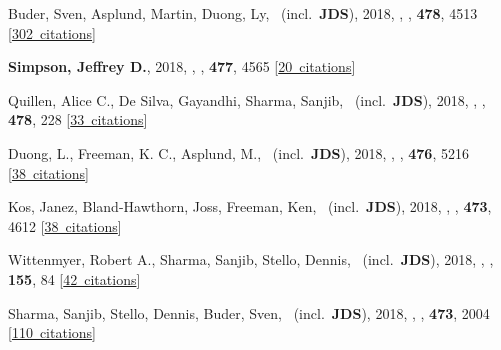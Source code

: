 \item[{\color{numcolor}\scriptsize19}] Buder, Sven, Asplund, Martin, Duong, Ly, \etal\ (incl.\ \textbf{JDS}), 2018, , \mnras, \textbf{478}, 4513 [\href{https://ui.adsabs.harvard.edu/#abs/2018MNRAS.478.4513B}{302~citations}]

\item[{\color{numcolor}\scriptsize18}] \textbf{Simpson, Jeffrey D.}, 2018, , \mnras, \textbf{477}, 4565 [\href{https://ui.adsabs.harvard.edu/#abs/2018MNRAS.477.4565S}{20~citations}]

\item[{\color{numcolor}\scriptsize17}] Quillen, Alice C., De Silva, Gayandhi, Sharma, Sanjib, \etal\ (incl.\ \textbf{JDS}), 2018, , \mnras, \textbf{478}, 228 [\href{https://ui.adsabs.harvard.edu/#abs/2018MNRAS.478..228Q}{33~citations}]

\item[{\color{numcolor}\scriptsize16}] Duong, L., Freeman, K. C., Asplund, M., \etal\ (incl.\ \textbf{JDS}), 2018, , \mnras, \textbf{476}, 5216 [\href{https://ui.adsabs.harvard.edu/#abs/2018MNRAS.476.5216D}{38~citations}]

\item[{\color{numcolor}\scriptsize15}] Kos, Janez, Bland-Hawthorn, Joss, Freeman, Ken, \etal\ (incl.\ \textbf{JDS}), 2018, , \mnras, \textbf{473}, 4612 [\href{https://ui.adsabs.harvard.edu/#abs/2018MNRAS.473.4612K}{38~citations}]

\item[{\color{numcolor}\scriptsize14}] Wittenmyer, Robert A., Sharma, Sanjib, Stello, Dennis, \etal\ (incl.\ \textbf{JDS}), 2018, , \aj, \textbf{155}, 84 [\href{https://ui.adsabs.harvard.edu/#abs/2018AJ....155...84W}{42~citations}]

\item[{\color{numcolor}\scriptsize13}] Sharma, Sanjib, Stello, Dennis, Buder, Sven, \etal\ (incl.\ \textbf{JDS}), 2018, , \mnras, \textbf{473}, 2004 [\href{https://ui.adsabs.harvard.edu/#abs/2018MNRAS.473.2004S}{110~citations}]

